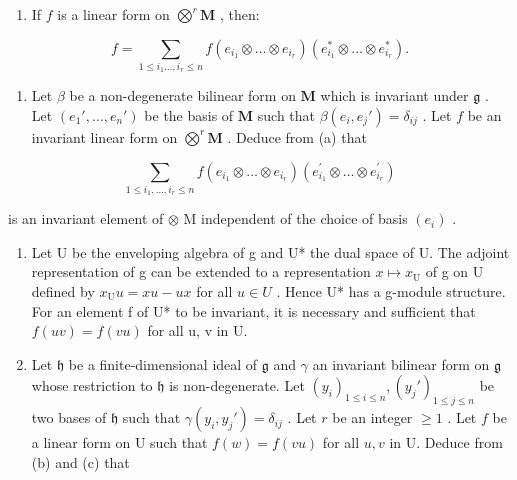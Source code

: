\begin{enumerate}
\def\labelenumi{(\alph{enumi})}
\tightlist
\item
  If \(f\) is a linear form on \(\bigotimes^{r} \mathbf{M}\) , then:
\end{enumerate}

\[
f = \sum_ {1 \leqslant i _ {1} \dots , i _ {r} \leqslant n} f (e _ {i _ {1}} \otimes \dots \otimes e _ {i _ {r}}) (e _ {i _ {1}} ^ {*} \otimes \dots \otimes e _ {i _ {r}} ^ {*}).
\]

\begin{enumerate}
\def\labelenumi{(\alph{enumi})}
\setcounter{enumi}{1}
\tightlist
\item
  Let \(\beta\) be a non-degenerate bilinear form on \(\mathbf{M}\) which is invariant under \(\mathfrak{g}\) . Let \((e_1', \ldots, e_n')\) be the basis of \(\mathbf{M}\) such that \(\beta(e_i, e_j') = \delta_{ij}\) . Let \(f\) be an invariant linear form on \(\bigotimes^r \mathbf{M}\) . Deduce from (a) that
\end{enumerate}

\[
\sum_ {1 \leqslant i _ {1}, \dots , i _ {r} \leqslant n} f (e _ {i _ {1}} \otimes \dots \otimes e _ {i _ {r}}) (e _ {i _ {1}} ^ {\prime} \otimes \dots \otimes e _ {i _ {r}} ^ {\prime})
\]

is an invariant element of \(\otimes\) M independent of the choice of basis \((e_i)\) .

\begin{enumerate}
\def\labelenumi{(\alph{enumi})}
\setcounter{enumi}{2}
\item
  Let U be the enveloping algebra of g and U* the dual space of U. The adjoint representation of g can be extended to a representation \(x \mapsto x_{\mathrm{U}}\) of g on U defined by \(x_{\mathrm{U}}u = xu - ux\) for all \(u \in U\) . Hence U* has a g-module structure. For an element f of U* to be invariant, it is necessary and sufficient that \(f(uv) = f(vu)\) for all u, v in U.
\item
  Let \(\mathfrak{h}\) be a finite-dimensional ideal of \(\mathfrak{g}\) and \(\gamma\) an invariant bilinear form on \(\mathfrak{g}\) whose restriction to \(\mathfrak{h}\) is non-degenerate. Let \((y_i)_{1\leq i\leq n}, (y_j')_{1\leq j\leq n}\) be two bases of \(\mathfrak{h}\) such that \(\gamma(y_i,y_j') = \delta_{ij}\) . Let \(r\) be an integer \(\geqslant 1\) . Let \(f\) be a linear form on U such that \(f(w) = f(vu)\) for all \(u,v\) in U. Deduce from (b) and (c) that
\end{enumerate}

